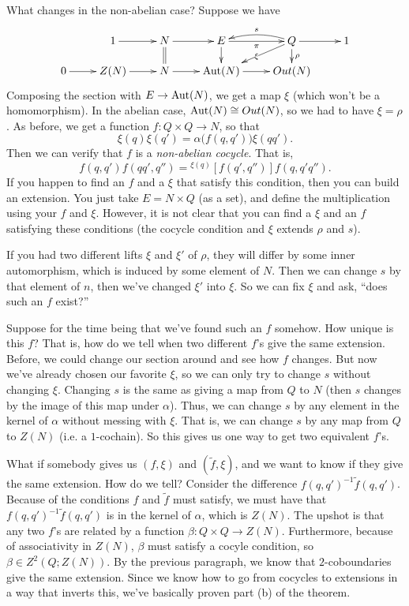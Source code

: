 What changes in the non-abelian case? Suppose we have
\[\xymatrix@R-1pc{
 & 1\ar[r] & N\ar[r]\ar@{=}[d] & E\ar[r]_\pi\ar[d] & Q\ar[r]\ar[d]^\rho \ar@/_/[l]_s \ar[dl]|\xi & 1\\
 0\ar[r]& Z(N)\ar[r]& N\ar[r] & \Aut(N)\ar[r] & Out(N)
}\]
Composing the section with $E\to \operatorname{Aut}(N)$, we get a map $\xi$ (which won't be a homomorphism). In the abelian case, $\operatorname{Aut}(N)\cong Out(N)$, so we had to have $\xi=\rho$. As before, we get a function $f\colon Q\times Q\to N$, so that
\[
 \xi(q)\xi(q')=\alpha\bigl(f(q,q')\bigr)\xi(qq').
\]
Then we can verify that $f$ is a \emph{non-abelian cocycle}. That is,
\[
 f(q,q')f(qq',q'') = {}^{\xi(q)}[f(q',q'')]f(q,q'q'').
\]
If you happen to find an $f$ and a $\xi$ that satisfy this condition, then you can build an extension. You just take $E=N\times Q$ (as a set), and define the multiplication using your $f$ and $\xi$. However, it is not clear that you can find a $\xi$ and an $f$ satisfying these conditions (the cocycle condition and $\xi$ extends $\rho$ and $s$).
\begin{remark}
 If you had two different lifts $\xi$ and $\xi'$ of $\rho$, they will differ by some inner automorphism, which is induced by some element of $N$. Then we can change $s$ by that element of $n$, then we've changed $\xi'$ into $\xi$. So we can fix $\xi$ and ask, ``does such an $f$ exist?''
\end{remark}
Suppose for the time being that we've found such an $f$ somehow. How unique is this $f$? That is, how do we tell when two different $f$'s give the same extension. Before, we could change our section around and see how $f$ changes. But now we've already chosen our favorite $\xi$, so we can only try to change $s$ without changing $\xi$. Changing $s$ is the same as giving a map from $Q$ to $N$ (then $s$ changes by the image of this map under $\alpha$). Thus, we can change $s$ by any element in the kernel of $\alpha$ without messing with $\xi$. That is, we can change $s$ by any map from $Q$ to $Z(N)$ (i.e. a $1$-cochain). So this gives us one way to get two equivalent $f$'s. 

What if somebody gives us $(f,\xi)$ and $(\tilde f,\xi)$, and we want to know if they give the same extension. How do we tell? Consider the difference $f(q,q')^{-1}\tilde f(q,q')$. Because of the conditions $f$ and $\tilde f$ must satisfy, we must have that $f(q,q')^{-1}\tilde f(q,q')$ is in the kernel of $\alpha$, which is $Z(N)$. The upshot is that any two $f$'s are related by a function $\beta\colon Q\times Q\to Z(N)$. Furthermore, because of associativity in $Z(N)$, $\beta$ must satisfy a cocyle condition, so $\beta\in Z^2(Q;Z(N))$. By the previous paragraph, we know that $2$-coboundaries give the same extension. Since we know how to go from cocycles to extensions in a way that inverts this, we've basically proven part (b) of the theorem.

